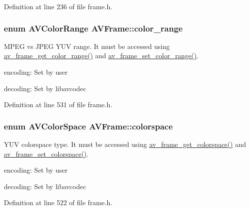 Definition at line 236 of file frame.\+h.

\subsubsection[{\texorpdfstring{color\+\_\+range}{color_range}}]{\setlength{\rightskip}{0pt plus 5cm}enum {\bf A\+V\+Color\+Range} A\+V\+Frame\+::color\+\_\+range}\hypertarget{struct_a_v_frame_a853afbad220bbc58549b4860732a3aa5}{}\label{struct_a_v_frame_a853afbad220bbc58549b4860732a3aa5}
M\+P\+EG vs J\+P\+EG Y\+UV range. It must be accessed using \hyperlink{group__lavu__frame_ga829e2f3cb3edcc04d76fa9eac37392cd}{av\+\_\+frame\+\_\+get\+\_\+color\+\_\+range()} and \hyperlink{group__lavu__frame_ga862e9789b46539b3edcf0ae4cb106f95}{av\+\_\+frame\+\_\+set\+\_\+color\+\_\+range()}.
\begin{DoxyItemize}
\item encoding\+: Set by user
\item decoding\+: Set by libavcodec 
\end{DoxyItemize}

Definition at line 531 of file frame.\+h.

\subsubsection[{\texorpdfstring{colorspace}{colorspace}}]{\setlength{\rightskip}{0pt plus 5cm}enum {\bf A\+V\+Color\+Space} A\+V\+Frame\+::colorspace}\hypertarget{struct_a_v_frame_a9262c231f1f64869439b4fe587fe1710}{}\label{struct_a_v_frame_a9262c231f1f64869439b4fe587fe1710}
Y\+UV colorspace type. It must be accessed using \hyperlink{group__lavu__frame_ga03224acf06cbd666f3878a2c35b3f704}{av\+\_\+frame\+\_\+get\+\_\+colorspace()} and \hyperlink{group__lavu__frame_ga43e7dd7b76a6d76811e7f33557fd48e6}{av\+\_\+frame\+\_\+set\+\_\+colorspace()}.
\begin{DoxyItemize}
\item encoding\+: Set by user
\item decoding\+: Set by libavcodec 
\end{DoxyItemize}

Definition at line 522 of file frame.\+h.


